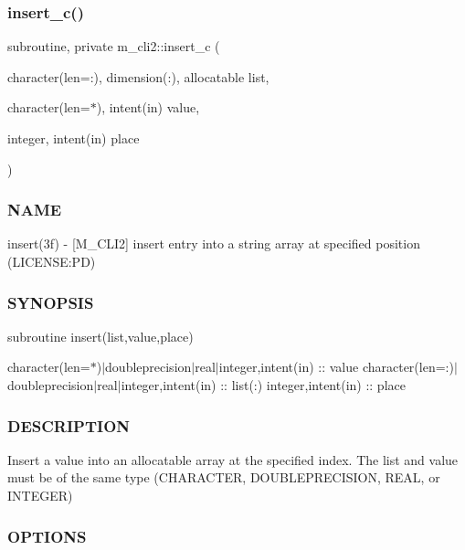 \subsubsection{\texorpdfstring{insert\+\_\+c()}{insert\_c()}}
{\footnotesize\ttfamily subroutine, private m\+\_\+cli2\+::insert\+\_\+c (\begin{DoxyParamCaption}\item[{character(len=\+:), dimension(\+:), allocatable}]{list,  }\item[{character(len=$\ast$), intent(in)}]{value,  }\item[{integer, intent(in)}]{place }\end{DoxyParamCaption})\hspace{0.3cm}{\ttfamily [private]}}



\subsubsection*{N\+A\+ME}

insert(3f) -\/ \mbox{[}M\+\_\+\+C\+L\+I2\mbox{]} insert entry into a string array at specified position (L\+I\+C\+E\+N\+SE\+:PD) 

\subsubsection*{S\+Y\+N\+O\+P\+S\+IS}

subroutine insert(list,value,place)

character(len=$\ast$)$\vert$doubleprecision$\vert$real$\vert$integer,intent(in) \+:\+: value character(len=\+:)$\vert$doubleprecision$\vert$real$\vert$integer,intent(in) \+:\+: list(\+:) integer,intent(in) \+:\+: place

\subsubsection*{D\+E\+S\+C\+R\+I\+P\+T\+I\+ON}

\begin{DoxyVerb}Insert a value into an allocatable array at the specified index.
The list and value must be of the same type (CHARACTER, DOUBLEPRECISION,
REAL, or INTEGER)
\end{DoxyVerb}


\subsubsection*{O\+P\+T\+I\+O\+NS}

